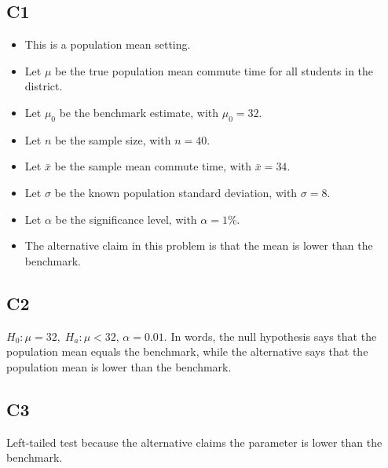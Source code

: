 \begin{ExamProblems}
		\subsection*{C1}
		\begin{itemize}
			\item This is a population mean setting.
			\item Let \(\mu\) be the true population mean commute time for all students in the district.
			\item Let \(\mu_0\) be the benchmark estimate, with \(\mu_0=32\).
			\item Let \(n\) be the sample size, with \(n=40\).
			\item Let \(\bar{x}\) be the sample mean commute time, with \(\bar{x}=34\).
			\item Let \(\sigma\) be the known population standard deviation, with \(\sigma=8\).
			\item Let \(\alpha\) be the significance level, with \(\alpha=1\%\).
			\item The alternative claim in this problem is that the mean is lower than the benchmark.
		\end{itemize}
		
		\subsection*{C2}
		\(H_0\colon \mu=32,\; H_a\colon \mu<32\), \(\alpha=0.01\). In words, the null hypothesis says that the population mean equals the benchmark, while the alternative says that the population mean is lower than the benchmark.
		
		\subsection*{C3}
		Left-tailed test because the alternative claims the parameter is lower than the benchmark.\LeftTailGraph
		
		\item

\end{ExamProblems}
